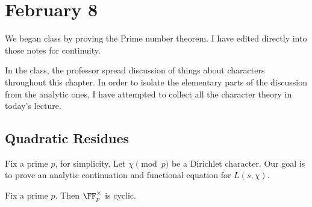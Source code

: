 \documentclass[../notes.tex]{subfiles}
\begin{document}
\section{February 8}

We began class by proving the Prime number theorem. I have edited directly into those notes for continuity.
\begin{warn}
	In the class, the professor spread discussion of things about characters throughout this chapter. In order to isolate the elementary parts of the discussion from the analytic ones, I have attempted to collect all the character theory in today's lecture.
\end{warn}

\subsection{Quadratic Residues}
Fix a prime $p$, for simplicity. Let $\chi\pmod p$ be a Dirichlet character. Our goal is to prove an analytic continuation and functional equation for $L(s,\chi)$.
\begin{proposition} \label{prop:fp-cyclic}
	Fix a prime $p$. Then $\FF_p^\times$ is cyclic.
\end{proposition}
\end{document}
